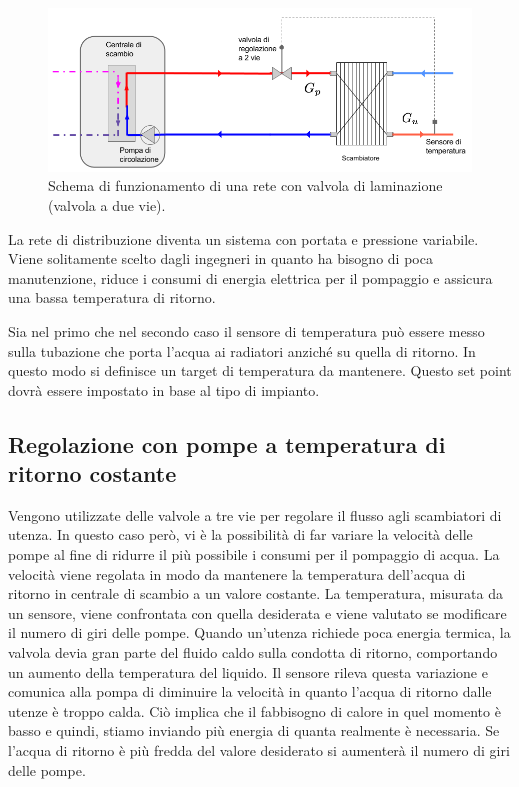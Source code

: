 \documentclass[laurea,oneside,11pt]{USiena_tesiLM3}
\begin{document}
\begin{figure}[!ht]
\centering
\includegraphics[width=\textwidth]{figure/2vie}
\caption{Schema di funzionamento di una rete con valvola di laminazione (valvola a due vie).}
\label{fig:2vie}

\end{figure}

La rete di distribuzione diventa un sistema con portata e pressione variabile. Viene solitamente scelto dagli ingegneri in quanto ha bisogno di poca manutenzione, riduce i consumi di energia elettrica per il pompaggio e assicura una bassa temperatura di ritorno.

Sia nel primo che nel secondo caso il sensore di temperatura può essere messo sulla tubazione che porta l'acqua ai radiatori anziché su quella di ritorno. In questo modo si definisce un target di temperatura da mantenere. Questo set point dovrà essere impostato in base al tipo di impianto.

\subsection{Regolazione con pompe a temperatura di ritorno costante}
Vengono utilizzate delle valvole a tre vie per regolare il flusso agli scambiatori di utenza. In questo caso però, vi è la possibilità di far variare la velocità delle pompe al fine di ridurre il più possibile i consumi per il pompaggio di acqua.
La velocità viene regolata in modo da mantenere la temperatura dell'acqua di ritorno in centrale di scambio a un valore costante. La temperatura, misurata da un sensore, viene confrontata con quella desiderata e viene valutato se modificare il numero di giri delle pompe. 
Quando un'utenza richiede poca energia termica, la valvola devia gran parte del fluido caldo sulla condotta di ritorno, comportando un aumento della temperatura del liquido. Il sensore rileva questa variazione e comunica alla pompa di diminuire la velocità in quanto l'acqua di ritorno dalle utenze è troppo calda. Ciò implica che il fabbisogno di calore in quel momento è basso e quindi, stiamo inviando più energia di quanta realmente è necessaria. Se l'acqua di ritorno è più fredda del valore desiderato si aumenterà il numero di giri delle pompe. 
\end{document}
